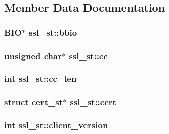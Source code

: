 \subsection{Member Data Documentation}
\hypertarget{structssl__st_ab0e7dbfa9d11fab6879da0ad8625b65b}{
\subsubsection[{bbio}]{\setlength{\rightskip}{0pt plus 5cm}B\-I\-O$\ast$ ssl\-\_\-st\-::bbio}}\label{structssl__st_ab0e7dbfa9d11fab6879da0ad8625b65b}
\hypertarget{structssl__st_a8d2686e3d92c65618418f05c8b8c591e}{
\subsubsection[{cc}]{\setlength{\rightskip}{0pt plus 5cm}unsigned char$\ast$ ssl\-\_\-st\-::cc}}\label{structssl__st_a8d2686e3d92c65618418f05c8b8c591e}
\hypertarget{structssl__st_a18e3426d378cc03bde20f422c5e1481a}{
\subsubsection[{cc\-\_\-len}]{\setlength{\rightskip}{0pt plus 5cm}int ssl\-\_\-st\-::cc\-\_\-len}}\label{structssl__st_a18e3426d378cc03bde20f422c5e1481a}
\hypertarget{structssl__st_a335d212e807952601a0eabf4dfd978eb}{
\subsubsection[{cert}]{\setlength{\rightskip}{0pt plus 5cm}struct {\bf cert\-\_\-st}$\ast$ ssl\-\_\-st\-::cert}}\label{structssl__st_a335d212e807952601a0eabf4dfd978eb}
\hypertarget{structssl__st_af898db9604614a95a6830fbb5ce31850}{
\subsubsection[{client\-\_\-version}]{\setlength{\rightskip}{0pt plus 5cm}int ssl\-\_\-st\-::client\-\_\-version}}\label{structssl__st_af898db9604614a95a6830fbb5ce31850}
